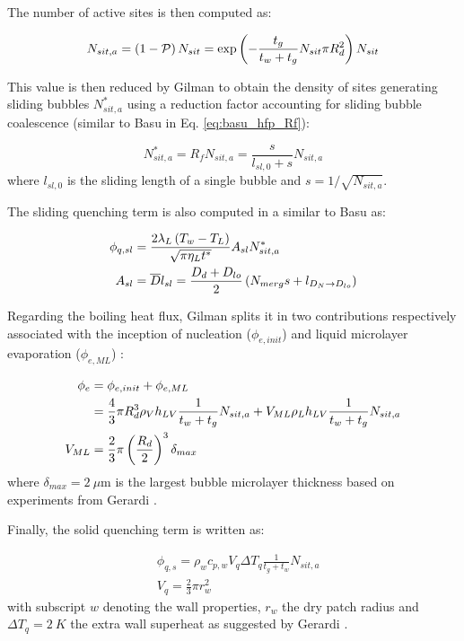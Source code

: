 The number of active sites is then computed as:

\begin{equation}
N_{sit,a} = \left( 1-\mathcal{P} \right)N_{sit} = \mathrm{exp}\left( -\dfrac{t_{g}}{t_{w}+t_{g}}N_{sit}\pi R_{d}^{2} \right) N_{sit}
\label{eq:gilman_hfp_nsita}
\end{equation}

This value is then reduced by Gilman to obtain the density of sites generating sliding bubbles $N_{sit,a}^{*}$ using a reduction factor accounting for sliding bubble coalescence (similar to Basu \etal in Eq. \ref{eq:basu_hfp_Rf}):

\begin{equation}
N_{sit,a}^{*}=R_{f}N_{sit,a} = \frac{s}{l_{sl,0}+s} N_{sit,a}
\end{equation}
where $l_{sl,0}$ is the sliding length of a single bubble and $s=1/\sqrt{N_{sit,a}}$.


The sliding quenching term is also computed in a similar to Basu \etal as:

\begin{align}
\phi_{q,sl}&=\frac{2\lambda_{L}\parth{T_{w}-T_{L}}}{\sqrt{\pi \eta_{L}t^{*}}}A_{sl}N_{sit,a}^{*} \\
%
A_{sl} &= \overline{D}l_{sl} = \frac{D_{d}+D_{lo}}{2}\parth{N_{merg}s+l_{D_{N}\rightarrow D_{lo}}}
\end{align}

Regarding the boiling heat flux, Gilman splits it in two contributions respectively associated with the inception of nucleation ($\phi_{e,init}$) and liquid microlayer evaporation ($\phi_{e,ML}$) :

\begin{align}
\phi_{e} &= \phi_{e,init} + \phi_{e,ML} \\
%
&= \frac{4}{3}\pi R_{d}^{3}\rho_{V} h_{LV} \frac{1}{t_{w}+t_{g}}N_{sit,a} + V_{ML} \rho_{L}h_{LV} \frac{1}{t_{w}+t_{g}}N_{sit,a}\\
%
V_{ML} &= \frac{2}{3}\pi \parth{\frac{R_{d}}{2}}^{3}\delta_{max}
\end{align}
where $\delta_{max}=2\ \mu\text{m}$ is the largest bubble microlayer thickness based on experiments from Gerardi \cite{gerardi}.

\npar

Finally, the solid quenching term is written as:

\begin{align}
& \phi_{q,s} = \rho_{w} c_{p,w} V_{q} \Delta T_{q} \frac{1}{t_{g}+t_{w}} N_{sit,a}\\
%
& V_{q} = \frac{2}{3} \pi r_{w}^{2}
\end{align}
with subscript $w$ denoting the wall properties, $r_{w}$ the dry patch radius and $\Delta T_{q}=2\ K$ the extra wall superheat as suggested by Gerardi \etal \cite{gerardi_etal}.

